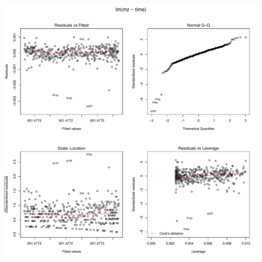 \documentclass[]{article}
\begin{document}
\includegraphics{Supplementary_document_files/figure-latex/fit.lin.651-1.pdf}
\end{document}
